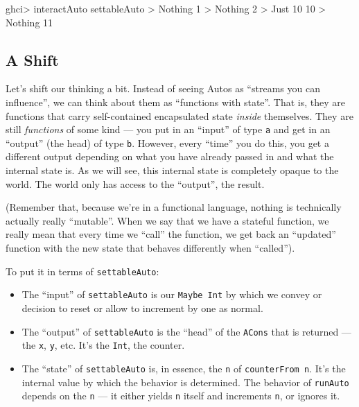 \documentclass[]{article}
\newenvironment{Shaded}{}{}
\newcommand{\DataTypeTok}[1]{\textcolor[rgb]{0.56,0.13,0.00}{{#1}}}
\newcommand{\DecValTok}[1]{\textcolor[rgb]{0.25,0.63,0.44}{{#1}}}
\newcommand{\FunctionTok}[1]{\textcolor[rgb]{0.02,0.16,0.49}{{#1}}}
\newcommand{\NormalTok}[1]{{#1}}
\begin{document}
\begin{Shaded}
\begin{Highlighting}[]
\NormalTok{ghci}\FunctionTok{>} \NormalTok{interactAuto settableAuto}
\FunctionTok{>} \DataTypeTok{Nothing}
\DecValTok{1}
\FunctionTok{>} \DataTypeTok{Nothing}
\DecValTok{2}
\FunctionTok{>} \DataTypeTok{Just} \DecValTok{10}
\DecValTok{10}
\FunctionTok{>} \DataTypeTok{Nothing}
\DecValTok{11}
\end{Highlighting}
\end{Shaded}

\subsection{A Shift}\label{a-shift}

Let's shift our thinking a bit. Instead of seeing Autos as ``streams you
can influence'', we can think about them as ``functions with state''.
That is, they are functions that carry self-contained encapsulated state
\emph{inside} themselves. They are still \emph{functions} of some kind
--- you put in an ``input'' of type \texttt{a} and get in an ``output''
(the head) of type \texttt{b}. However, every ``time'' you do this, you
get a different output depending on what you have already passed in and
what the internal state is. As we will see, this internal state is
completely opaque to the world. The world only has access to the
``output'', the result.

(Remember that, because we're in a functional language, nothing is
technically actually really ``mutable''. When we say that we have a
stateful function, we really mean that every time we ``call'' the
function, we get back an ``updated'' function with the new state that
behaves differently when ``called'').

To put it in terms of \texttt{settableAuto}:

\begin{itemize}
\tightlist
\item
  The ``input'' of \texttt{settableAuto} is our \texttt{Maybe\ Int} by
  which we convey or decision to reset or allow to increment by one as
  normal.
\item
  The ``output'' of \texttt{settableAuto} is the ``head'' of the
  \texttt{ACons} that is returned --- the \texttt{x}, \texttt{y}, etc.
  It's the \texttt{Int}, the counter.
\item
  The ``state'' of \texttt{settableAuto} is, in essence, the \texttt{n}
  of \texttt{counterFrom\ n}. It's the internal value by which the
  behavior is determined. The behavior of \texttt{runAuto} depends on
  the \texttt{n} --- it either yields \texttt{n} itself and increments
  \texttt{n}, or ignores it.
\end{itemize}
\end{document}
